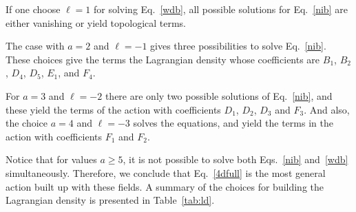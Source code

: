 If one choose $\ell = 1$ for solving Eq.~\eqref{wdb}, all possible solutions for Eq.~\eqref{nib} are either vanishing or yield topological terms.

The case with $a=2$ and $\ell = -1$ gives three possibilities to solve Eq.~\eqref{nib}. These choices give the terms the Lagrangian density whose coefficients are $B_1$, $B_2$, $D_4$, $D_5$, $E_1$, and $F_4$.

For $a = 3$ and $\ell = -2$ there are only two possible solutions of Eq.~\eqref{nib}, and these yield the terms of the action with coefficients $D_1$, $D_2$, $D_3$ and $F_3$. And also, the choice $a = 4$ and $\ell = -3$ solves the equations, and yield the terms in the action with coefficients $F_1$ and $F_2$.

Notice that for values $a \ge 5$, it is not possible to solve both Eqs.~\eqref{nib} and~\eqref{wdb} simultaneously. Therefore, we conclude that Eq.~\eqref{4dfull} is the most general action built up with these fields. A summary of the choices for building the Lagrangian density is presented in Table~\ref{tab:ld}.

